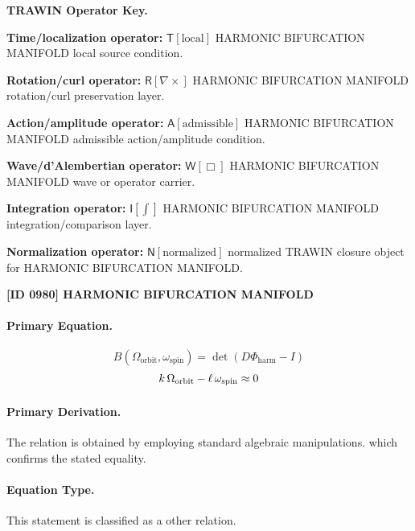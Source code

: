 \par\vspace{0.45\baselineskip}
\noindent\begin{minipage}[t]{\linewidth}
\begingroup
\small
\raggedright
\textbf{TRAWIN Operator Key.}\par
\noindent\textbf{Time/localization operator:} $\mathsf{T}\!\left[\mathrm{local}\right]$ HARMONIC BIFURCATION MANIFOLD local source condition.\par
\noindent\textbf{Rotation/curl operator:} $\mathsf{R}\!\left[\nabla\times\right]$ HARMONIC BIFURCATION MANIFOLD rotation/curl preservation layer.\par
\noindent\textbf{Action/amplitude operator:} $\mathsf{A}\!\left[\mathrm{admissible}\right]$ HARMONIC BIFURCATION MANIFOLD admissible action/amplitude condition.\par
\noindent\textbf{Wave/d'Alembertian operator:} $\mathsf{W}\!\left[\Box\right]$ HARMONIC BIFURCATION MANIFOLD wave or operator carrier.\par
\noindent\textbf{Integration operator:} $\mathsf{I}\!\left[\int\right]$ HARMONIC BIFURCATION MANIFOLD integration/comparison layer.\par
\noindent\textbf{Normalization operator:} $\mathsf{N}\!\left[\mathrm{normalized}\right]$ normalized TRAWIN closure object for HARMONIC BIFURCATION MANIFOLD.\par
\endgroup
\end{minipage}

\clearpage
\noindent\textbf{[ID 0980] HARMONIC BIFURCATION MANIFOLD}\par
\vspace{0.35em}
\paragraph{Primary Equation.}
\[
B(\Omega_{\mathrm{orbit}},\omega_{\mathrm{spin}})=
\det\!\left(D\Phi_{\mathrm{harm}}-I\right)
\]
\[
k\,\Omega_{\rm orbit}-\ell\,\omega_{\rm spin}\approx 0
\]

\paragraph{Primary Derivation.}
The relation is obtained by employing standard algebraic manipulations. which confirms the stated equality.
\paragraph{Equation Type.}
This statement is classified as a other relation.

